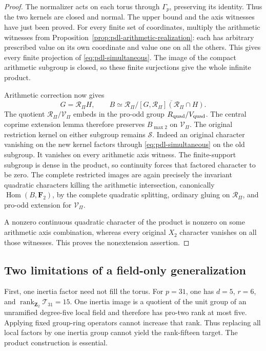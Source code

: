 \begin{proof}
The normalizer acts on each torus through \(\Gamma_p\), preserving its
identity. Thus the two kernels are closed and normal. The upper bound
and the axis witnesses have just been proved.
For every finite set of coordinates, multiply the arithmetic
witnesses from Proposition~\ref{prop:pdl-arithmetic-realization}:
each has arbitrary prescribed value on its own coordinate
and value one on all the others. This gives every finite
projection of \eqref{eq:pdl-simultaneous}. The image of
the compact arithmetic subgroup is closed, so these finite
surjections give the whole infinite product.

Arithmetic correction now gives
\[
 G=\mathcal R_{\Pi}H,\qquad
 B\simeq \mathcal R_{\Pi}/
 \overline{[G,\mathcal R_{\Pi}](\mathcal R_{\Pi}\cap H)}.
\]
The quotient \(\mathcal R_{\Pi}/\mathcal V_{\Pi}\)
embeds in the pro-odd group \(R_{\rm quad}/V_{\rm quad}\).
The central coprime extension lemma therefore preserves
\(B_{\max2}\) on \(\mathcal V_{\Pi}\).
The original restriction kernel on either subgroup remains
\(\mathcal S\). Indeed an original character vanishing on the new
kernel factors through \eqref{eq:pdl-simultaneous} on the
old subgroup. It vanishes on every arithmetic axis witness.
The finite-support subgroup is dense in the product, so
continuity forces that factored character to be zero.
The complete restricted images are again precisely the
invariant quadratic characters killing the arithmetic
intersection, canonically \(\operatorname{Hom}(B,\mathbf F_2)\),
by the complete quadratic splitting, ordinary gluing on
\(\mathcal R_{\Pi}\), and pro-odd extension for
\(\mathcal V_{\Pi}\).

A nonzero continuous quadratic character of the product is nonzero on
some arithmetic axis combination, whereas every original \(X_2\)
character vanishes on all those witnesses. This proves the nonextension
assertion.
\end{proof}

\subsection{Two limitations of a field-only generalization}

First, one inertia factor need not fill the torus. For
\(p=31\), one has \(d=5\), \(r=6\), and
\(\operatorname{rank}_{\mathbf Z_2}\mathcal T_{31}=15\).
One inertia image is a quotient of the unit group of an
unramified degree-five local field and therefore has
pro-two rank at most five. Applying fixed group-ring
operators cannot increase that rank. Thus replacing all
local factors by one inertia group cannot yield the
rank-fifteen target. The product construction is essential.

